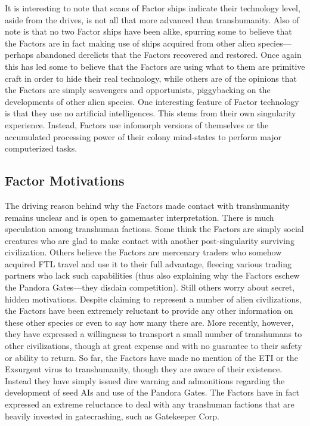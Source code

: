 It is interesting to note that scans of Factor ships 
indicate their technology level, aside from the drives, 
is not all that more advanced than transhumanity. 
Also of note is that no two Factor ships have been 
alike, spurring some to believe that the Factors are 
in fact making use of ships acquired from other alien 
species—perhaps abandoned derelicts that the Factors 
recovered and restored. Once again this has led some 
to believe that the Factors are using what to them are 
primitive craft in order to hide their real technology, 
while others are of the opinions that the Factors are 
simply scavengers and opportunists, piggybacking on 
the developments of other alien species.
One interesting feature of Factor technology is that 
they use no artificial intelligences. This stems from 
their own singularity experience. Instead, Factors use 
infomorph versions of themselves or the accumulated 
processing power of their colony mind-states to perform
major computerized tasks.

\subsection{Factor Motivations}

The driving reason behind why the Factors made contact
with transhumanity remains unclear and is open to
gamemaster interpretation. There is much speculation 
among transhuman factions. Some think the Factors 
are simply social creatures who are glad to make contact
with another post-singularity surviving civilization.
Others believe the Factors are mercenary traders who 
somehow acquired FTL travel and use it to their full 
advantage, fleecing various trading partners who lack 
such capabilities (thus also explaining why the Factors 
eschew the Pandora Gates—they disdain competition). 
Still others worry about secret, hidden motivations.
Despite claiming to represent a number of alien 
civilizations, the Factors have been extremely reluctant
to provide any other information on these other
species or even to say how many there are. More 
recently, however, they have expressed a willingness 
to transport a small number of transhumans to other 
civilizations, though at great expense and with no 
guarantee to their safety or ability to return.
So far, the Factors have made no mention of the 
ETI or the Exsurgent virus to transhumanity, though 
they are aware of their existence. Instead they have 
simply issued dire warning and admonitions regarding 
the development of seed AIs and use of the Pandora 
Gates. The Factors have in fact expressed an extreme 
reluctance to deal with any transhuman factions that 
are heavily invested in gatecrashing, such as Gatekeeper
Corp.

